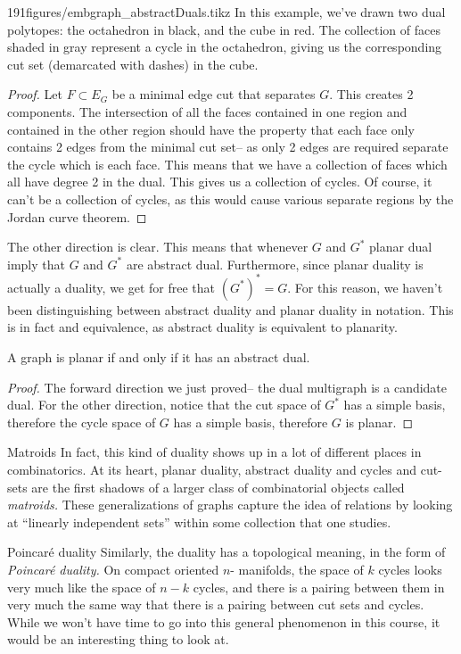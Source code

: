 \begin{examplefigureenv}{191figures/embgraph_abstractDuals.tikz}
  In this example, we've drawn two dual polytopes: the octahedron in black, and the cube in red. The collection of faces shaded in gray represent a cycle in the octahedron, giving us the corresponding cut set (demarcated with dashes) in the cube.
\end{examplefigureenv}
\begin{proof}
 Let $F\subset E_G$ be a minimal edge cut that separates $G$. This creates 2 components. The intersection of all the faces contained in one region and contained in the other region should have the property that each face only contains 2 edges from the minimal cut set-- as only 2 edges are required separate the cycle which is each face. This means that we have a collection of faces which all have degree 2 in the dual. This gives us a collection of cycles. Of course, it can't be a collection of cycles, as this would cause various separate regions by the Jordan curve theorem. 
\end{proof}
The other direction is clear.  This means that whenever $G$ and $G^*$ planar dual imply that $G$ and $G^*$ are abstract dual. Furthermore, since planar duality is actually a duality, we get for free that $(G^*)^*=G$. For this reason, we haven't been distinguishing between abstract duality and planar duality in notation. This is in fact and equivalence, as abstract duality is equivalent to planarity. 
\begin{theorem}[Whitney]
 A graph is planar if and only if it has an abstract dual.
\end{theorem}
\begin{proof}
 The forward direction we just proved-- the dual multigraph is a candidate dual. For the other direction, notice that the cut space of $G^*$ has a simple basis, therefore the cycle space of $G$ has a simple basis, therefore $G$ is planar. 
\end{proof}
\begin{projectdescription}{Matroids}
In fact, this kind of duality shows up in a lot of different places in combinatorics. At its heart, planar duality, abstract duality and cycles and cut-sets are the first shadows of a larger class of combinatorial objects called \emph{matroids.} \label{proj:matroids.} These generalizations of graphs capture the idea of relations by looking at ``linearly independent sets'' within some collection that one studies. 
\end{projectdescription}

\begin{projectdescription}{Poincar\'e duality}
Similarly, the duality has a topological meaning, in the form of \emph{Poincar\'e duality.} On compact oriented $n$- manifolds, the space of $k$ cycles looks very much like the space of $n-k$ cycles, and there is a pairing between them in very much the same way that there is a pairing between cut sets and cycles. While we won't have time to go into this general phenomenon in this course, it would be an interesting thing to look at. 
\end{projectdescription}